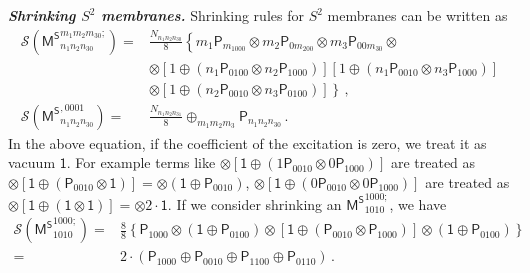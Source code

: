 \documentclass[11pt,nofootinbib,preprint]{revtex4-1}
\begin{document}
\textbf{\textit{Shrinking $S^2$ membranes.}}
Shrinking rules for $S^2$ membranes can be written as 
\begin{align}
	\mathcal{S} \left( {\mathsf{M}^{\mathsf{S}}}_{n_1n_2n_30}^{m_1m_2m_30;} \right) =&\frac{N_{n_1n_2n_30}}{8}\left\{ m_1\mathsf{P}_{m_1000}\otimes m_2\mathsf{P}_{0m_200}\otimes m_3\mathsf{P}_{00m_30}\otimes \right. \nonumber 
	\\
	&\otimes \left[ 1\oplus \left( n_1\mathsf{P}_{0100}\otimes n_2\mathsf{P}_{1000} \right) \right] \left[ 1\oplus \left( n_1\mathsf{P}_{0010}\otimes n_3\mathsf{P}_{1000} \right) \right] \nonumber
	\\
	&\left.  \otimes \left[ 1\oplus \left( n_2\mathsf{P}_{0010}\otimes n_3\mathsf{P}_{0100} \right) \right] \right\} \,,
	\\
	\mathcal{S} \left( {\mathsf{M}^{\mathsf{S}}}_{n_1n_2n_30}^{,0001} \right) =&\frac{N_{n_1n_2n_31}}{8}\oplus _{m_1m_2m_3}\mathsf{P}_{n_1n_2n_30}\,.
\end{align}
In the above equation, if the coefficient of the excitation is zero, we treat it as vacuum $\mathsf{1}$. For example terms like $\otimes \left[ \mathsf{1}\oplus \left( 1\mathsf{P}_{0010}\otimes 0\mathsf{P}_{1000} \right) \right] $ are treated as $\otimes \left[ \mathsf{1}\oplus \left( \mathsf{P}_{0010}\otimes \mathsf{1} \right) \right]=\otimes \left( \mathsf{1}\oplus \mathsf{P}_{0010} \right)$, $\otimes \left[ \mathsf{1}\oplus \left( 0\mathsf{P}_{0010}\otimes 0\mathsf{P}_{1000} \right) \right] $ are treated as $\otimes \left[ \mathsf{1}\oplus \left( \mathsf{1}\otimes \mathsf{1} \right) \right]=\otimes 2\cdot \mathsf{1}$. If we consider shrinking an $\mathsf{M^S}_{1010}^{1000;}$, we have 
\begin{align}
	\mathcal{S} \left( {\mathsf{M}^{\mathsf{S}}}_{1010}^{1000;} \right) =&\frac{8}{8}\left\{ \mathsf{P}_{1000}\otimes \left( \mathsf{1}\oplus \mathsf{P}_{0100} \right) \otimes \left[ \mathsf{1}\oplus \left( \mathsf{P}_{0010}\otimes \mathsf{P}_{1000} \right) \right] \otimes \left( \mathsf{1}\oplus \mathsf{P}_{0100} \right)  \right\} \nonumber
	\\
	=&2\cdot \left( \mathsf{P}_{1000}\oplus \mathsf{P}_{0010}\oplus \mathsf{P}_{1100}\oplus \mathsf{P}_{0110} \right) \,.
\end{align}
\end{document}
